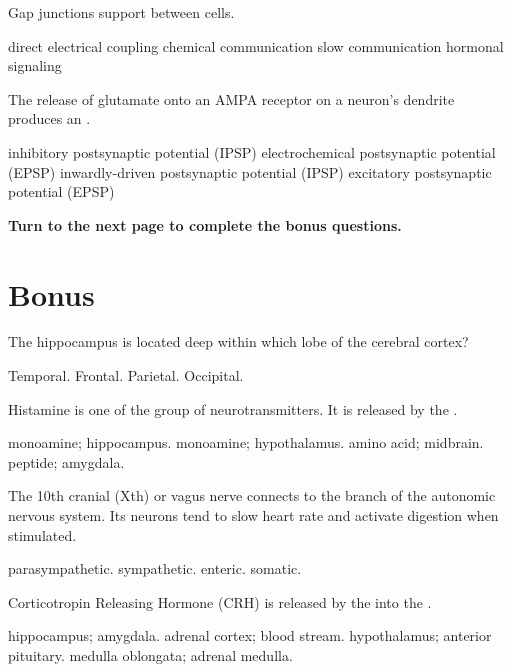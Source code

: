 \documentclass[answers]{exam}
\begin{document}
\begin{questions}

\question Gap junctions support \fillin between cells.
\begin{choices}
\correctchoice direct electrical coupling
\choice chemical communication
\choice slow communication
\choice hormonal signaling
\end{choices}

\question The release of glutamate onto an AMPA receptor on a neuron's dendrite produces an \fillin.
\begin{choices}
\choice inhibitory postsynaptic potential (IPSP)
\choice electrochemical postsynaptic potential (EPSP)
\choice inwardly-driven postsynaptic potential (IPSP)
\correctchoice excitatory postsynaptic potential (EPSP)
\end{choices}

\vspace{2cm}
\begin{center}
\textbf{Turn to the next page to complete the bonus questions.}
\end{center}

\newpage
\section{Bonus}

\question The hippocampus is located deep within which lobe of the cerebral cortex?
\begin{choices}
\correctchoice Temporal.
\choice Frontal.
\choice Parietal.
\choice Occipital.
\end{choices}

\question Histamine is one of the \fillin group of neurotransmitters. It is released by the \fillin.
\begin{choices}
\choice monoamine; hippocampus.
\correctchoice monoamine; hypothalamus.
\choice amino acid; midbrain.
\choice peptide; amygdala.
\end{choices}

\question The 10th cranial (Xth) or vagus nerve connects to the \fillin branch of the autonomic nervous system. Its neurons tend to slow heart rate and activate digestion when stimulated.
\begin{choices}
\correctchoice parasympathetic.
\choice sympathetic.
\choice enteric.
\choice somatic.
\end{choices}

\question Corticotropin Releasing Hormone (CRH) is released by the \fillin into the \fillin.
\begin{choices}
\choice hippocampus; amygdala.
\choice adrenal cortex; blood stream.
\correctchoice hypothalamus; anterior pituitary.
\choice medulla oblongata; adrenal medulla.
\end{choices}

\end{questions}
\end{document}

